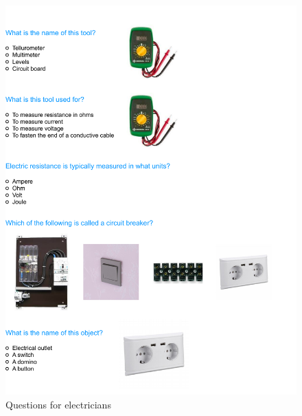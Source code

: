 \documentclass[
  a4paper, twoside, 12pt]{book}
\begin{document}
\begin{singlespacing}
\begin{figure}[H]
\includegraphics{figures/questionnaire/electricians} \caption{\label{fig:qs_electricians}Questions for electricians}\label{fig:unnamed-chunk-9}
\end{figure}
\end{singlespacing}

\renewcommand{\thesection}{\arabic{chapter}.\arabic{section}}
\setcounter{section}{0}
\renewcommand{\thesubsection}{\arabic{chapter}.\arabic{section}.\arabic{subsection}}
\setcounter{subsection}{0}

\newpage

\printbibliography[heading=bibintoc]
\end{document}
